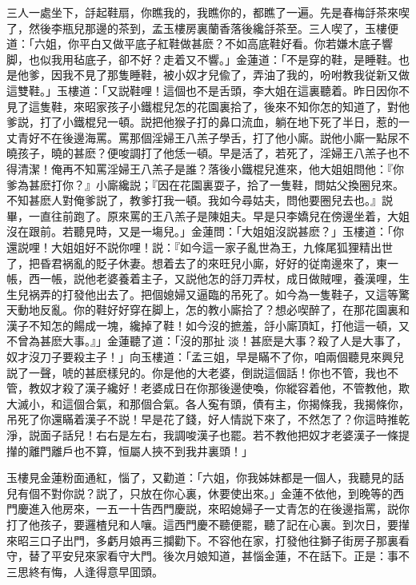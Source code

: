 三人一處坐下，㧱起鞋扇，你瞧我的，我瞧你的，都瞧了一遍。先是春梅㧱茶來喫了，然後李瓶兒那邊的茶到，孟玉樓房裏蘭香落後纔㧱茶至。三人喫了，玉樓便道：「六姐，你平白又做平底子紅鞋做甚麽？不如高底鞋好看。你若嫌木底子響脚，也似我用毡底子，卻不好？走着又不響。」金蓮道：「不是穿的鞋，是睡鞋。也是他爹，因我不見了那隻睡鞋，被小奴才兒偸了，弄油了我的，吩咐教我従新又做這雙鞋。」玉樓道：「又説鞋哩！這個也不是舌頭，李大姐在這裏聽着。昨日因你不見了這隻鞋，來昭家孩子小鐵棍兒怎的花園裏拾了，後來不知你怎的知道了，對他爹説，打了小鐵棍兒一頓。説把他猴子打的鼻口流血，躺在地下死了半日，惹的一丈青好不在後邊海罵。罵那個淫婦王八羔子學舌，打了他小廝。説他小廝一點尿不曉孩子，曉的甚麽？便唆調打了他恁一頓。早是活了，若死了，淫婦王八羔子也不得清潔！俺再不知罵淫婦王八羔子是誰？落後小鐵棍兒進來，他大姐姐問他：『你爹為甚麽打你？』小廝纔説；『因在花園裏耍子，拾了一隻鞋，問姑父換圈兒來。不知甚麽人對俺爹説了，教爹打我一頓。我如今尋姑夫，問他要圈兒去也。』説畢，一直往前跑了。原來罵的王八羔子是陳姐夫。早是只李嬌兒在傍邊坐着，大姐沒在跟前。若聽見時，又是一塲兒。」金蓮問：「大姐姐沒説甚麽？」玉樓道：「你還説哩！大姐姐好不説你哩！説：『如今這一家子亂世為王，九條尾狐狸精出世了，把昏君祸亂的貶子休妻。想着去了的來旺兒小廝，好好的従南邊來了，東一帳，西一帳，説他老婆養着主子，又説他怎的㧱刀弄杖，成日做賊哩，養漢哩，生生兒祸弄的打發他出去了。把個媳婦又逼臨的吊死了。如今為一隻鞋子，又這等驚天動地反亂。你的鞋好好穿在脚上，怎的教小廝拾了？想必喫醉了，在那花園裏和漢子不知怎的餳成一塊，纔掉了鞋！如今沒的摭羞，㧱小廝頂缸，打他這一頓，又不曾為甚麽大事。』」金蓮聽了道：「沒的那扯𣭈淡！甚麽是大事？殺了人是大事了，奴才沒刀子要殺主子！」向玉樓道：「孟三姐，早是瞞不了你，咱兩個聽見來興兒説了一聲，唬的甚麽樣兒的。你是他的大老婆，倒説這個話！你也不管，我也不管，教奴才殺了漢子纔好！老婆成日在你那後邊使喚，你縱容着他，不管教他，欺大滅小，和這個合氣，和那個合氣。各人寃有頭，債有主，你揭條我，我揭條你，吊死了你還瞞着漢子不説！早是花了錢，好人情説下來了，不然怎了？你這時推乾淨，説面子話兒！右右是左右，我調唆漢子也罷。若不教他把奴才老婆漢子一條提攆的離門離戶也不算，恒屬人挾不到我井裏頭！」

玉樓見金蓮粉面通紅，惱了，又勸道：「六姐，你我姊妹都是一個人，我聽見的話兒有個不對你説？説了，只放在你心裏，休要使出來。」金蓮不依他，到晚等的西門慶進入他房來，一五一十告西門慶説，來昭媳婦子一丈青怎的在後邊指罵，説你打了他孩子，要邏楂兒和人嚷。這西門慶不聽便罷，聽了記在心裏。到次日，要攆來昭三口子出門，多虧月娘再三攔勸下。不容他在家，打發他往獅子街房子那裏看守，替了平安兒來家看守大門。後次月娘知道，甚惱金蓮，不在話下。正是：事不三思終有悔，人逢得意早囬頭。

